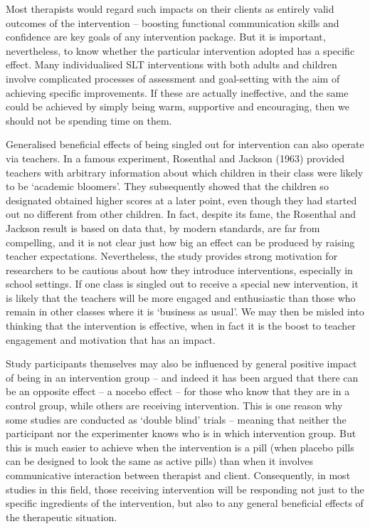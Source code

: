 \documentclass[]{book}
\begin{document}
Most therapists would regard such impacts on their clients as entirely valid outcomes of the intervention -- boosting functional communication skills and confidence are key goals of any intervention package. But it is important, nevertheless, to know whether the particular intervention adopted has a specific effect. Many individualised SLT interventions with both adults and children involve complicated processes of assessment and goal-setting with the aim of achieving specific improvements. If these are actually ineffective, and the same could be achieved by simply being warm, supportive and encouraging, then we should not be spending time on them.

Generalised beneficial effects of being singled out for intervention can also operate via teachers. In a famous experiment, Rosenthal and Jackson (1963) provided teachers with arbitrary information about which children in their class were likely to be `academic bloomers'. They subsequently showed that the children so designated obtained higher scores at a later point, even though they had started out no different from other children. In fact, despite its fame, the Rosenthal and Jackson result is based on data that, by modern standards, are far from compelling, and it is not clear just how big an effect can be produced by raising teacher expectations. Nevertheless, the study provides strong motivation for researchers to be cautious about how they introduce interventions, especially in school settings. If one class is singled out to receive a special new intervention, it is likely that the teachers will be more engaged and enthusiastic than those who remain in other classes where it is `business as usual'. We may then be misled into thinking that the intervention is effective, when in fact it is the boost to teacher engagement and motivation that has an impact.

Study participants themselves may also be influenced by general positive impact of being in an intervention group -- and indeed it has been argued that there can be an opposite effect -- a nocebo effect -- for those who know that they are in a control group, while others are receiving intervention. This is one reason why some studies are conducted as `double blind' trials -- meaning that neither the participant nor the experimenter knows who is in which intervention group. But this is much easier to achieve when the intervention is a pill (when placebo pills can be designed to look the same as active pills) than when it involves communicative interaction between therapist and client. Consequently, in most studies in this field, those receiving intervention will be responding not just to the specific ingredients of the intervention, but also to any general beneficial effects of the therapeutic situation.
\end{document}
